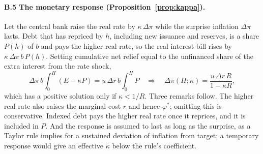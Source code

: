 \paragraph{B.5 The monetary response (Proposition~\ref{prop:kappa}).} Let the central bank raise the real rate by $\kappa\,\Delta\pi$ while the surprise inflation $\Delta\pi$ lasts. Debt that has repriced by $h$, including new issuance and reserves, is a share $P(h)$ of $b$ and pays the higher real rate, so the real interest bill rises by $\kappa\,\Delta\pi\,b\,P(h)$. Setting cumulative net relief equal to the unfinanced share of the extra interest from the rate shock,
\begin{equation}
\Delta\pi\,b\int_0^H(E-\kappa P)=u\,\Delta r\,b\int_0^H P\quad\Rightarrow\quad\Delta\pi(H;\kappa)=\frac{u\,\Delta r\,R}{1-\kappa R},
\end{equation}
which has a positive solution only if $\kappa<1/R$. Three remarks follow. The higher real rate also raises the marginal cost $r$ and hence $\varphi^*$; omitting this is conservative. Indexed debt pays the higher real rate once it reprices, and it is included in $P$. And the response is assumed to last as long as the surprise, as a Taylor rule implies for a sustained deviation of inflation from target; a temporary response would give an effective $\kappa$ below the rule's coefficient.
